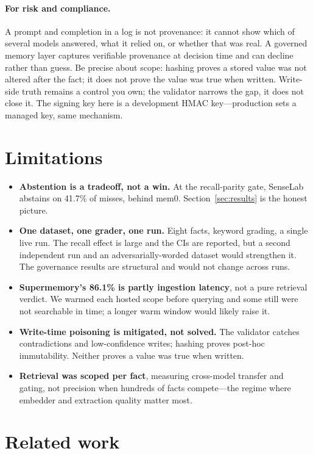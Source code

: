 \documentclass[11pt]{article}
\begin{document}
\paragraph{For risk and compliance.} A prompt and completion in a log is not provenance: it
cannot show which of several models answered, what it relied on, or whether that was real. A
governed memory layer captures verifiable provenance at decision time and can decline rather
than guess. Be precise about scope: hashing proves a stored value was not altered after the
fact; it does not prove the value was true when written. Write-side truth remains a control
you own; the validator narrows the gap, it does not close it. The signing key here is a
development HMAC key---production sets a managed key, same mechanism.

\section{Limitations}\label{sec:limits}

\begin{itemize}[topsep=2pt,itemsep=1pt]
\item \textbf{Abstention is a tradeoff, not a win.} At the recall-parity gate, SenseLab abstains
  on 41.7\% of misses, behind mem0. Section~\ref{sec:results} is the honest picture.
\item \textbf{One dataset, one grader, one run.} Eight facts, keyword grading, a single live
  run. The recall effect is large and the CIs are reported, but a second independent run and
  an adversarially-worded dataset would strengthen it. The governance results are structural
  and would not change across runs.
\item \textbf{Supermemory's 86.1\% is partly ingestion latency}, not a pure retrieval
  verdict. We warmed each hosted scope before querying and some still were not searchable in
  time; a longer warm window would likely raise it.
\item \textbf{Write-time poisoning is mitigated, not solved.} The validator catches
  contradictions and low-confidence writes; hashing proves post-hoc immutability. Neither
  proves a value was true when written.
\item \textbf{Retrieval was scoped per fact}, measuring cross-model transfer and gating, not
  precision when hundreds of facts compete---the regime where embedder and extraction
  quality matter most.
\end{itemize}

\section{Related work}\label{sec:related}
\end{document}

